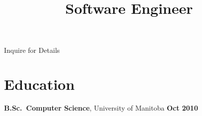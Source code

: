\documentclass[margin,line,letterpaper]{resume}
\begin{document}
\begin{resume}
  \title{\bf Software Engineer}
  \location{}
  \begin{position}
    Inquire for Details
  \end{position}


  \section{\mysidestyle Education}

  {\bf B.Sc.~Computer Science}, University of Manitoba \hfill {\bf Oct 2010}

\end{resume}
\end{document}
